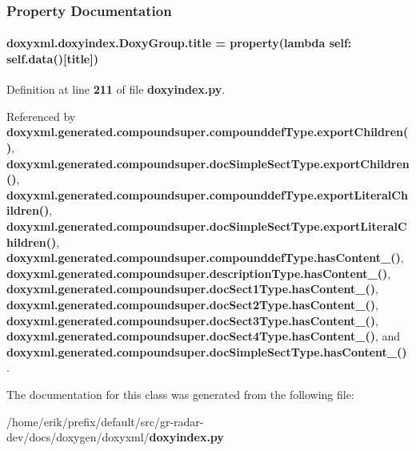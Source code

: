 \subsubsection{Property Documentation}
\paragraph[{title}]{\setlength{\rightskip}{0pt plus 5cm}doxyxml.\+doxyindex.\+Doxy\+Group.\+title = {\bf property}(lambda self\+: {\bf self.\+data}()[\textquotesingle{}title\textquotesingle{}])\hspace{0.3cm}{\ttfamily [static]}}\label{classdoxyxml_1_1doxyindex_1_1DoxyGroup_abb4f26e5431a21fb3d5be7c892070da7}


Definition at line {\bf 211} of file {\bf doxyindex.\+py}.



Referenced by {\bf doxyxml.\+generated.\+compoundsuper.\+compounddef\+Type.\+export\+Children()}, {\bf doxyxml.\+generated.\+compoundsuper.\+doc\+Simple\+Sect\+Type.\+export\+Children()}, {\bf doxyxml.\+generated.\+compoundsuper.\+compounddef\+Type.\+export\+Literal\+Children()}, {\bf doxyxml.\+generated.\+compoundsuper.\+doc\+Simple\+Sect\+Type.\+export\+Literal\+Children()}, {\bf doxyxml.\+generated.\+compoundsuper.\+compounddef\+Type.\+has\+Content\+\_\+()}, {\bf doxyxml.\+generated.\+compoundsuper.\+description\+Type.\+has\+Content\+\_\+()}, {\bf doxyxml.\+generated.\+compoundsuper.\+doc\+Sect1\+Type.\+has\+Content\+\_\+()}, {\bf doxyxml.\+generated.\+compoundsuper.\+doc\+Sect2\+Type.\+has\+Content\+\_\+()}, {\bf doxyxml.\+generated.\+compoundsuper.\+doc\+Sect3\+Type.\+has\+Content\+\_\+()}, {\bf doxyxml.\+generated.\+compoundsuper.\+doc\+Sect4\+Type.\+has\+Content\+\_\+()}, and {\bf doxyxml.\+generated.\+compoundsuper.\+doc\+Simple\+Sect\+Type.\+has\+Content\+\_\+()}.



The documentation for this class was generated from the following file\+:\begin{DoxyCompactItemize}
\item 
/home/erik/prefix/default/src/gr-\/radar-\/dev/docs/doxygen/doxyxml/{\bf doxyindex.\+py}\end{DoxyCompactItemize}
